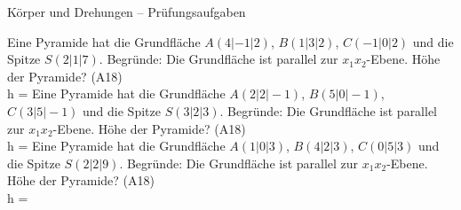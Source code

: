\begin{aufgabe}{Körper und Drehungen – Prüfungsaufgaben}
\begin{teile}
\teil Eine Pyramide hat die Grundfläche $A(4 | -1 | 2)$, $B(1 | 3 | 2)$, $C(-1 | 0 | 2)$ und die Spitze $S(2 | 1 | 7)$. Begründe: Die Grundfläche ist parallel zur $x_1x_2$-Ebene. Höhe der Pyramide? \hfill (A18) \\ h = \leerfeld
\teil Eine Pyramide hat die Grundfläche $A(2 | 2 | -1)$, $B(5 | 0 | -1)$, $C(3 | 5 | -1)$ und die Spitze $S(3 | 2 | 3)$. Begründe: Die Grundfläche ist parallel zur $x_1x_2$-Ebene. Höhe der Pyramide? \hfill (A18) \\ h = \leerfeld
\teil Eine Pyramide hat die Grundfläche $A(1 | 0 | 3)$, $B(4 | 2 | 3)$, $C(0 | 5 | 3)$ und die Spitze $S(2 | 2 | 9)$. Begründe: Die Grundfläche ist parallel zur $x_1x_2$-Ebene. Höhe der Pyramide? \hfill (A18) \\ h = \leerfeld
\end{teile}
\end{aufgabe}

